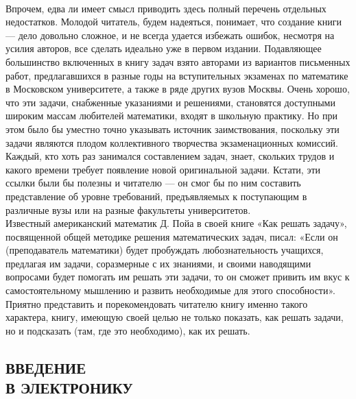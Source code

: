 \documentclass[a4paper,12pt]{article}
\begin{document}
\begin{multicols}{3}
\\Впрочем, едва ли имеет смысл приводить здесь полный перечень отдельных недостатков. Молодой читатель, будем надеяться, понимает, что создание книги — дело довольно сложное, и не всегда удается избежать ошибок, несмотря на усилия авторов, все сделать идеально уже в первом издании. Подавляющее большинство включенных в книгу задач взято авторами из вариантов письменных работ, предлагавшихся в разные годы на вступительных экзаменах по математике в Московском университете, а также в ряде других вузов Москвы. Очень хорошо, что эти задачи, снабженные указаниями и решениями, становятся доступными широким массам любителей математики, входят в школьную практику. Но при этом было бы уместно точно указывать источник заимствования, поскольку эти задачи являются плодом коллективного творчества экзаменационных комиссий. Каждый, кто хоть раз занимался составлением задач, знает, скольких трудов и какого времени требует появление новой оригинальной задачи. Кстати, эти ссылки были бы полезны и читателю — он смог бы по ним составить представление об уровне требований, предъявляемых к поступающим в различные вузы или на разные факультеты университетов.\\Известный американский математик Д. Пойа в своей книге «Как решать задачу», посвященной общей методике решения математических задач, писал: «Если он (преподаватель математики) будет пробуждать любознательность учащихся, предлагая им задачи, соразмерные с их знаниями, и своими наводящими вопросами будет помогать им решать эти задачи, то он сможет привить им вкус к самостоятельному мышлению и развить необходимые для этого способности». Приятно представить и порекомендовать читателю книгу именно такого характера, книгу, имеющую своей целью не только показать, как решать задачи, но и подсказать (там, где это необходимо), как их решать.
\columnbreak
\subsection*{ВВЕДЕНИЕ \\В ЭЛЕКТРОНИКУ}


\end{multicols}
\end{document}
